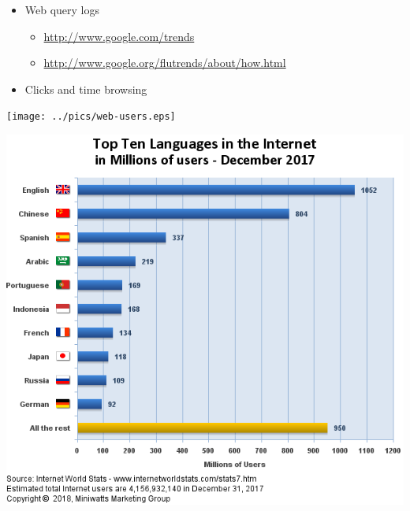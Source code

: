 \documentclass[a4paper,landscape,headrule,footrule,xetex]{foils}
\begin{document}

\begin{itemize}
\item Web query logs
  \begin{itemize}
  \item \url{http://www.google.com/trends}
  \item \url{http://www.google.org/flutrends/about/how.html}
  \end{itemize}
\item Clicks and time browsing
\end{itemize}


\texttt{[image: ../pics/web-users.eps]}


\includegraphics[height=\textheight]{../pics/languages2017Q4.png}
\end{document}
